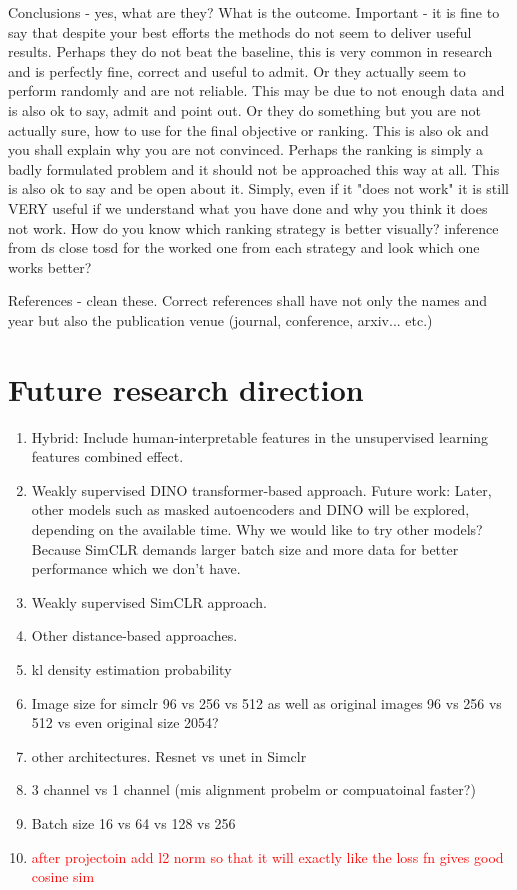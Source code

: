 	Conclusions - yes, what are they? What is the outcome. Important - it is fine to say that despite your best efforts the methods do not seem to
	 deliver useful results. Perhaps they do not beat the baseline, this is very common in research and is perfectly fine, correct and useful to admit.
	  Or they actually seem to perform randomly and are not reliable. This may be due to not enough data and is also ok to say, admit and point out. Or 
	  they do something but you are not actually sure, how to use for the final objective or ranking. This is also ok and you shall explain why you are 
	  not convinced. Perhaps the ranking is simply a badly formulated problem and it should not be approached this way at all. This is also ok to say and 
	  be open about it. Simply, even if it "does not work" it is still VERY useful if we understand what you have done and why you think it does not work.	
How do you know which ranking strategy is better visually? inference from ds close tosd for the worked one from each strategy and look which one works 
better?

References - clean these. Correct references shall have not only the names and year but also the publication venue (journal, conference, arxiv... etc.)

\section{Future research direction}

\begin{enumerate}
    \item Hybrid: Include human-interpretable features in the unsupervised learning features combined effect.
    \item Weakly supervised DINO transformer-based approach. Future work: Later, other models such as masked autoencoders and DINO will be explored, depending on the available time.
	Why we would like to try other models? Because SimCLR demands larger batch size and more data for better performance which we don't have.
    \item Weakly supervised SimCLR approach.
    \item Other distance-based approaches.
    \item kl density estimation probability
    \item Image size for simclr 96 vs 256 vs 512 as well as original images 96 vs 256 vs 512 vs even original size 2054?
    \item other architectures. Resnet vs unet in Simclr
    \item 3 channel vs 1 channel (mis alignment probelm or compuatoinal faster?)
    \item Batch size 16 vs 64 vs 128 vs 256
    \item \textcolor{red}{after projectoin add l2 norm so that it will exactly like the loss fn gives good cosine sim} 

\end{enumerate}